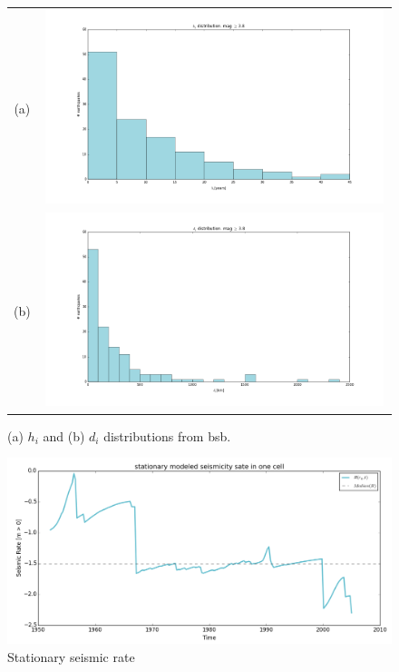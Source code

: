 \documentclass[grl]{agutex}
\begin{document}

\begin{figure}
	\begin{center}
	\begin{table}[H]
		\begin{tabular}{ c c }
		\footnotesize(a)
		& \includegraphics[width=0.99\textwidth]{z_img_hi_histogram}
		\\
		\footnotesize(b)
        & \includegraphics[width=0.99\textwidth]{z_img_di_histogram}
		\end{tabular}
	\end{table}
	\caption{(a) $h_i$ and (b) $d_i$ distributions from \gls{bsb}.}
	\label{fig_hidi_histogram}
	\end{center}
\end{figure}



\begin{figure}
	\includegraphics[width=0.99\linewidth]{z_img_helmstetter_stationary_a}
	\caption{Stationary seismic rate}
	\label{fig_helmstetter_stationary_rate}
\end{figure}
\end{document}
